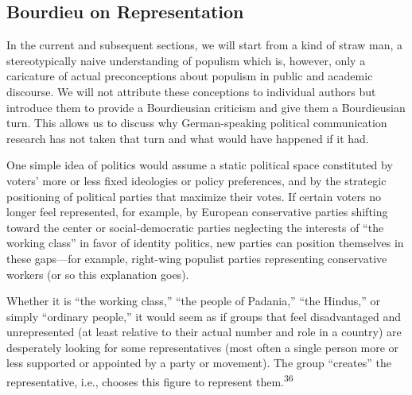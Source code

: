 \documentclass{tufte-handout}
\begin{document}
\hypertarget{bourdieu-on-representation}{%
\subsection{Bourdieu on
Representation}\label{bourdieu-on-representation}}

In the current and subsequent sections, we will start from a kind of
straw man, a stereotypically naive understanding of populism which is,
however, only a caricature of actual preconceptions about populism in
public and academic discourse. We will not attribute these conceptions
to individual authors but introduce them to provide a Bourdieusian
criticism and give them a Bourdieusian turn. This allows us to discuss
why German-speaking political communication research has not taken that
turn and what would have happened if it had.

One simple idea of politics would assume a static political space
constituted by voters' more or less fixed ideologies or policy
preferences, and by the strategic positioning of political parties that
maximize their votes. If certain voters no longer feel represented, for
example, by European conservative parties shifting toward the center or
social-democratic parties neglecting the interests of ``the working
class'' in favor of identity politics, new parties can position
themselves in these gaps---for example, right-wing populist parties
representing conservative workers (or so this explanation goes).

Whether it is ``the working class,'' ``the people of Padania,'' ``the
Hindus,'' or simply ``ordinary people,'' it would seem as if groups that
feel disadvantaged and unrepresented (at least relative to their actual
number and role in a country) are desperately looking for some
representatives (most often a single person more or less supported or
appointed by a party or movement). The group ``creates'' the
representative, i.e., chooses this figure to represent them.\textsuperscript{36}
\end{document}
